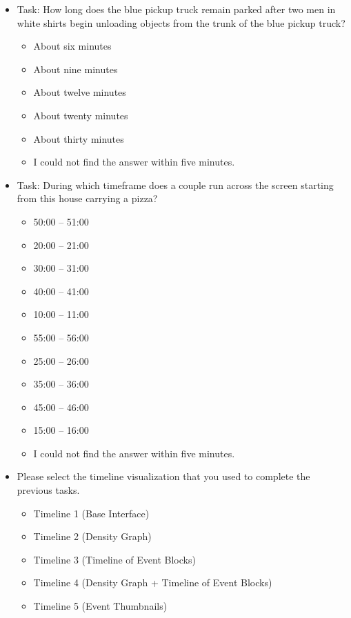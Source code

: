 \documentclass[doublespace,draft,nopageskip]{VTthesis} %
\begin{document}
\begin{itemize}
    \item Task: How long does the blue pickup truck remain parked after two men in white shirts begin unloading objects from the trunk of the blue pickup truck?
    \begin{itemize}
        \item About six minutes
        \item About nine minutes
        \item About twelve minutes
        \item About twenty minutes
        \item About thirty minutes
        \item I could not find the answer within five minutes.
    \end{itemize}
    \item Task: During which timeframe does a couple run across the screen starting from this house carrying a pizza?
    \begin{itemize}
        \item 50:00 – 51:00
        \item 20:00 – 21:00
        \item 30:00 – 31:00
        \item 40:00 – 41:00
        \item 10:00 – 11:00
        \item 55:00 – 56:00
        \item 25:00 – 26:00
        \item 35:00 – 36:00
        \item 45:00 – 46:00
        \item 15:00 – 16:00
        \item I could not find the answer within five minutes.
    \end{itemize}
    \item Please select the timeline visualization that you used to complete the previous tasks.
    \begin{itemize}
        \item Timeline 1 (Base Interface)
        \item Timeline 2 (Density Graph)
        \item Timeline 3 (Timeline of Event Blocks)
        \item Timeline 4 (Density Graph + Timeline of Event Blocks)
        \item Timeline 5 (Event Thumbnails)
    \end{itemize}

\end{itemize}
\end{document}
